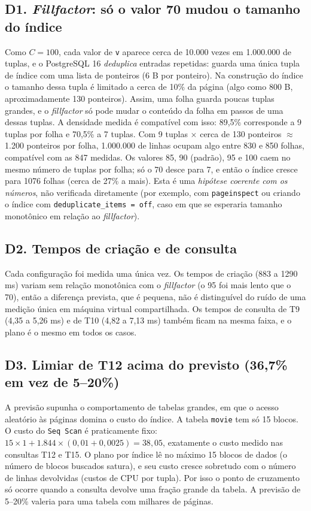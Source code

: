 \documentclass[11pt,a4paper]{article}
\newcommand{\tp}[1]{\texttt{#1}}
\begin{document}
\subsection*{D1. \emph{Fillfactor}: só o valor 70 mudou o tamanho do índice}
Como $C = 100$, cada valor de \tp{v} aparece cerca de 10.000 vezes em 1.000.000 de tuplas, e o PostgreSQL 16 \emph{deduplica} entradas repetidas: guarda uma única tupla de índice com uma lista de ponteiros (6 B por ponteiro). Na construção do índice o tamanho dessa tupla é limitado a cerca de 10\% da página (algo como 800 B, aproximadamente 130 ponteiros). Assim, uma folha guarda poucas tuplas grandes, e o \emph{fillfactor} só pode mudar o conteúdo da folha em passos de uma dessas tuplas. A densidade medida é compatível com isso: 89,5\% corresponde a 9 tuplas por folha e 70,5\% a 7 tuplas. Com 9 tuplas $\times$ cerca de 130 ponteiros $\approx$ 1.200 ponteiros por folha, 1.000.000 de linhas ocupam algo entre 830 e 850 folhas, compatível com as 847 medidas. Os valores 85, 90 (padrão), 95 e 100 caem no mesmo número de tuplas por folha; só o 70 desce para 7, e então o índice cresce para 1076 folhas (cerca de 27\% a mais). Esta é uma \emph{hipótese coerente com os números}, não verificada diretamente (por exemplo, com \tp{pageinspect} ou criando o índice com \tp{deduplicate\_items = off}, caso em que se esperaria tamanho monotônico em relação ao \emph{fillfactor}).

\subsection*{D2. Tempos de criação e de consulta}
Cada configuração foi medida uma única vez. Os tempos de criação (883 a 1290 ms) variam sem relação monotônica com o \emph{fillfactor} (o 95 foi mais lento que o 70), então a diferença prevista, que é pequena, não é distinguível do ruído de uma medição única em máquina virtual compartilhada. Os tempos de consulta de T9 (4,35 a 5,26 ms) e de T10 (4,82 a 7,13 ms) também ficam na mesma faixa, e o plano é o mesmo em todos os casos.

\subsection*{D3. Limiar de T12 acima do previsto (36,7\% em vez de 5--20\%)}
A previsão supunha o comportamento de tabelas grandes, em que o acesso aleatório às páginas domina o custo do índice. A tabela \tp{movie} tem só 15 blocos. O custo do \tp{Seq Scan} é praticamente fixo: $15 \times 1 + 1.844 \times (0{,}01 + 0{,}0025) = 38{,}05$, exatamente o custo medido nas consultas T12 e T15. O plano por índice lê no máximo 15 blocos de dados (o número de blocos buscados satura), e seu custo cresce sobretudo com o número de linhas devolvidas (custos de CPU por tupla). Por isso o ponto de cruzamento só ocorre quando a consulta devolve uma fração grande da tabela. A previsão de 5--20\% valeria para uma tabela com milhares de páginas.
\end{document}

